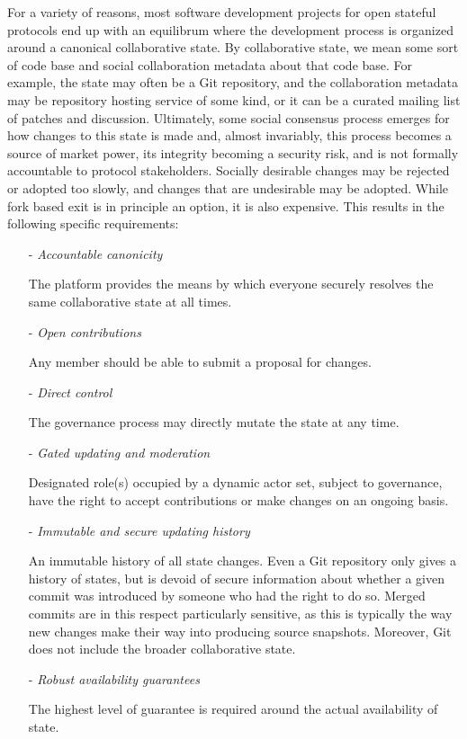 \documentclass{article}
\begin{document}
For a variety of reasons, most software development projects for open stateful protocols end up with an equilibrum where the development process is organized around a canonical collaborative state. By collaborative state, we mean some sort of code base and social collaboration metadata about that code base. For example, the state may often be a Git repository, and the collaboration metadata may be repository hosting service of some kind, or it can be a curated mailing list of patches and discussion. Ultimately, some social consensus process emerges for how changes to this state is made and, almost invariably, this process becomes a source of market power, its integrity becoming a security risk, and is not formally accountable to protocol stakeholders. Socially desirable changes may be rejected or adopted too slowly, and changes that are undesirable may be adopted. While fork based exit is in principle an option, it is also expensive. This results in the following specific requirements:

\begin{enumerate}

    \item[-] \textit{Accountable canonicity}

    The platform provides the means by which everyone securely resolves the same collaborative state at all times.

    \item[-] \textit{Open contributions}

    Any member should be able to submit a proposal for changes.

    \item[-] \textit{Direct control}

    The governance process may directly mutate the state at any time.

    \item[-] \textit{Gated updating and moderation}

    Designated role(s) occupied by a dynamic actor set, subject to governance, have the right to accept contributions or make changes on an ongoing basis.

    \item[-] \textit{Immutable and secure updating history}

    An immutable history of all state changes. Even a Git repository only gives a history of states, but is devoid of secure information about whether a given commit was introduced by someone who had the right to do so. Merged commits are in this respect particularly sensitive, as this is typically the way new changes make their way into producing source snapshots. Moreover, Git does not include the broader collaborative state.

    \item[-] \textit{Robust availability guarantees}

    The highest level of guarantee is required around the actual availability of state.

\end{enumerate}
\end{document}
